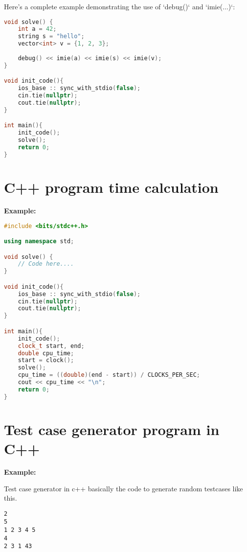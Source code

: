 Here's a complete example demonstrating the use of `debug()` and `imie(...)`:

\begin{lstlisting}[language=C++, caption={Debugging Example}]
void solve() {
    int a = 42;
    string s = "hello";
    vector<int> v = {1, 2, 3};
    
    debug() << imie(a) << imie(s) << imie(v);
}

void init_code(){
    ios_base :: sync_with_stdio(false);
    cin.tie(nullptr);
    cout.tie(nullptr);
}

int main(){
    init_code();
    solve();
    return 0;
}
\end{lstlisting}


\section{C++ program time calculation}

\textbf{Example:}

\begin{lstlisting}[language=C++, caption={CPP Code time Example}]
#include <bits/stdc++.h>

using namespace std;

void solve() {
    // Code here....
}

void init_code(){
    ios_base :: sync_with_stdio(false);
    cin.tie(nullptr);
    cout.tie(nullptr);
}

int main(){
    init_code();
    clock_t start, end;
    double cpu_time;
    start = clock();
    solve();
    cpu_time = ((double)(end - start)) / CLOCKS_PER_SEC;
    cout << cpu_time << "\n";
    return 0;
}
\end{lstlisting}

\newpage

\section{Test case generator program in C++}

\textbf{Example:}

Test case generator in c++ basically the code to generate random testcases like this.
\begin{verbatim}
2
5
1 2 3 4 5
4
2 3 1 43
\end{verbatim}

